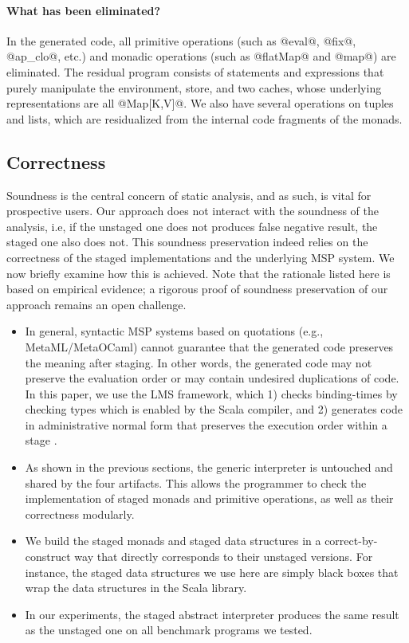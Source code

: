 \paragraph{What has been eliminated?} In the generated code, all
primitive operations (such as @eval@, @fix@, @ap_clo@, etc.) and monadic
operations (such as @flatMap@ and @map@) are eliminated. The residual program
consists of statements and expressions that purely manipulate the environment,
store, and two caches, whose underlying representations are all @Map[K,V]@.
We also have several operations on tuples and lists, which are residualized from
the internal code fragments of the monads. 

\subsection{Correctness}

Soundness is the central concern of static analysis, and as such, is vital for
prospective users. Our approach does not interact with the soundness of the analysis,
i.e, if the unstaged one does not produces false negative result, the staged
one also does not. This soundness preservation indeed relies on the correctness
of the staged implementations and the underlying MSP system. We now briefly
examine how this is achieved. Note that the rationale listed
here is based on empirical evidence; a rigorous proof of soundness
preservation of our approach remains an open challenge.

\begin{itemize}
  \item 
    In general, syntactic MSP systems based on quotations (e.g.,
    MetaML/MetaOCaml) cannot guarantee that the generated code preserves the
    meaning after staging. In other words, the generated code may not preserve
    the evaluation order or may contain undesired duplications of code.
    In this paper, we use the LMS framework, which 1) checks binding-times by
    checking types which is enabled by the Scala compiler, and 2) generates
    code in administrative normal form \cite{Flanagan:1993:ECC:155090.155113}
    that preserves the execution order within a stage
    \cite{DBLP:conf/birthday/Rompf16}.
  \item As shown in the previous sections, the generic interpreter is untouched
    and shared by the four artifacts.  This allows the programmer to
    check the implementation of staged monads and primitive operations,
    as well as their correctness modularly.
  \item We build the staged monads and staged data structures in a
    correct-by-construct way that directly corresponds to their unstaged
    versions. For instance, the staged data structures we use here are simply
    black boxes that wrap the data structures in the Scala library.
  \item In our experiments, the staged abstract interpreter produces the same
    result as the unstaged one on all benchmark programs we tested.
\end{itemize}

